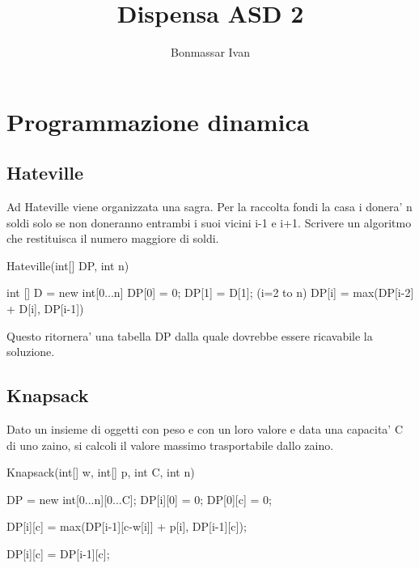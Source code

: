 \documentclass[oneside]{book}
\title {Dispensa ASD 2}
\author{Bonmassar Ivan}
\begin{document}
\maketitle
\tableofcontents


\chapter{Programmazione dinamica}
\section{Hateville}

Ad Hateville viene organizzata una sagra. Per la raccolta fondi la casa i donera' n soldi solo se non doneranno entrambi i suoi vicini i-1 e i+1. Scrivere un algoritmo che restituisca il numero maggiore di soldi.
\begin{algorithmic}
\begin{algorithm}
\caption{Hateville(int[] DP, int n)}\label{alg:cap}

\State int [] D = new int[0...n]
\State DP[0] = 0;
\State DP[1] = D[1];
\For (i=2 to n)
	\State DP[i] = max(DP[i-2] + D[i], DP[i-1])
\EndFor

\end{algorithm}
\end{algorithmic}
Questo ritornera' una tabella DP dalla quale dovrebbe essere ricavabile la soluzione.

\newpage
\section{Knapsack}
Dato un insieme di oggetti con peso e con un loro valore e data una capacita' C di uno zaino, si calcoli il valore massimo trasportabile dallo zaino.

\begin{algorithm}
\caption{Knapsack(int[] w, int[] p, int C, int n)}\label{alg:cap}
\begin{algorithmic}
\State 	DP = new int[0...n][0...C];
	\State DP[i][0] = 0;
\EndFor
{}
\State DP[0][c] = 0;
\EndFor

			\State DP[i][c] = max(DP[i-1][c-w[i]] + p[i], DP[i-1][c]);
		
		\Else 	
			\State DP[i][c] = DP[i-1][c];	
		\EndIf
		
	\EndFor
\EndFor	

\end{algorithmic}
\end{algorithm}
\end{document}
